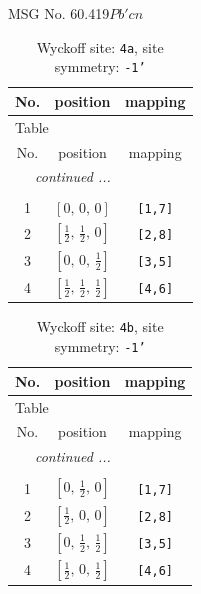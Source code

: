 \documentclass[fleqn,8pt]{jsarticle}
\begin{document}
\setcounter{MaxMatrixCols}{32}

\renewcommand{\tablename}{Table~}
\renewcommand{\figurename}{Figure~}
\begin{center}
\LARGE
MSG No. 60.419\quad$Pb'cn$
\end{center}
\renewcommand{\arraystretch}{1.2}
\begin{longtable}{ccc}
\caption{Wyckoff site: {\tt 4a}, site symmetry: {\tt -1'}}
 \\
 \hline \hline
No. & position & mapping \\ \hline \endfirsthead

\multicolumn{2}{l}{\tablename\ \thetable{}} \\
 \hline \hline
No. & position & mapping \\ \hline \endhead

 \hline \hline
\multicolumn{2}{r}{\footnotesize\it continued ...} \\ \endfoot

 \hline \hline
\multicolumn{2}{r}{} \\ \endlastfoot

1 & $\left[ 0,\, 0,\, 0 \right]$ & {\tt [1,7]} \\ \hline
2 & $\left[ \frac{1}{2},\, \frac{1}{2},\, 0 \right]$ & {\tt [2,8]} \\ \hline
3 & $\left[ 0,\, 0,\, \frac{1}{2} \right]$ & {\tt [3,5]} \\ \hline
4 & $\left[ \frac{1}{2},\, \frac{1}{2},\, \frac{1}{2} \right]$ & {\tt [4,6]} \\
\end{longtable}
\renewcommand{\arraystretch}{1.2}
\begin{longtable}{ccc}
\caption{Wyckoff site: {\tt 4b}, site symmetry: {\tt -1'}}
 \\
 \hline \hline
No. & position & mapping \\ \hline \endfirsthead

\multicolumn{2}{l}{\tablename\ \thetable{}} \\
 \hline \hline
No. & position & mapping \\ \hline \endhead

 \hline \hline
\multicolumn{2}{r}{\footnotesize\it continued ...} \\ \endfoot

 \hline \hline
\multicolumn{2}{r}{} \\ \endlastfoot

1 & $\left[ 0,\, \frac{1}{2},\, 0 \right]$ & {\tt [1,7]} \\ \hline
2 & $\left[ \frac{1}{2},\, 0,\, 0 \right]$ & {\tt [2,8]} \\ \hline
3 & $\left[ 0,\, \frac{1}{2},\, \frac{1}{2} \right]$ & {\tt [3,5]} \\ \hline
4 & $\left[ \frac{1}{2},\, 0,\, \frac{1}{2} \right]$ & {\tt [4,6]} \\
\end{longtable}
\end{document}
